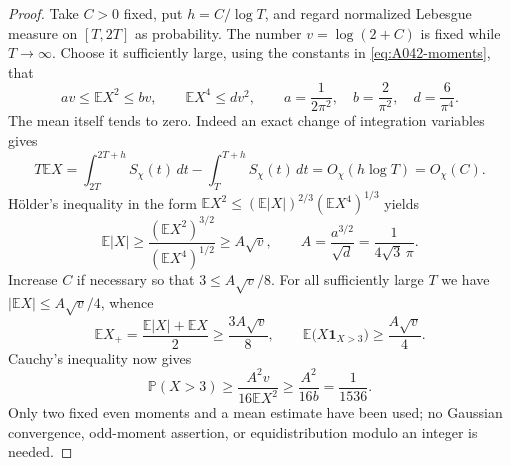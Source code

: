 \begin{proof}
Take $C>0$ fixed, put $h=C/\log T$, and regard normalized
Lebesgue measure on $[T,2T]$ as probability. The number
$v=\log(2+C)$ is fixed while $T\longrightarrow\infty$.
Choose it sufficiently large, using the constants in
\eqref{eq:A042-moments}, that
\[
 av\le\mathbb EX^2\le bv,\qquad
 \mathbb EX^4\le dv^2,\qquad
 a=\frac1{2\pi^2},\quad b=\frac2{\pi^2},\quad d=\frac6{\pi^4}.
\]
The mean itself tends to zero. Indeed an exact change of
integration variables gives
\[
 T\mathbb EX=\int_{2T}^{2T+h}S_\chi(t)\,dt
                         -\int_T^{T+h}S_\chi(t)\,dt
                         =O_\chi(h\log T)=O_\chi(C).
\]
H\"older's inequality in the form
$\mathbb EX^2\le(\mathbb E|X|)^{2/3}
(\mathbb EX^4)^{1/3}$ yields
\[
 \mathbb E|X|\ge\frac{(\mathbb EX^2)^{3/2}}
                         {(\mathbb EX^4)^{1/2}}
             \ge A\sqrt v,\qquad
 A=\frac{a^{3/2}}{\sqrt d}=\frac1{4\sqrt3\,\pi}.
\]
Increase $C$ if necessary so that $3\le A\sqrt v/8$.
For all sufficiently large $T$ we have
$|\mathbb EX|\le A\sqrt v/4$, whence
\[
 \mathbb EX_+=\frac{\mathbb E|X|+\mathbb EX}{2}
                       \ge\frac{3A\sqrt v}{8},
 \qquad
 \mathbb E\bigl(X\mathbf1_{X>3}\bigr)
                       \ge\frac{A\sqrt v}{4}.
\]
Cauchy's inequality now gives
\[
 \mathbb P(X>3)
 \ge\frac{A^2v}{16\mathbb EX^2}
 \ge\frac{A^2}{16b}=\frac1{1536}.
\]
Only two fixed even moments and a mean estimate have been used;
no Gaussian convergence, odd-moment assertion, or equidistribution
modulo an integer is needed.
\end{proof}

